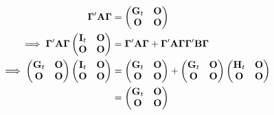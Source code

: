 \begin{Lemma}{}{}
\begin{align*}
        \Matrix{\Gamma}'\Matrix{A\Gamma}
         & =
        \begin{pmatrix}
            \Matrix{G}_t & \Matrix{O} \\
            \Matrix{O}   & \Matrix{O}
        \end{pmatrix}                                                                             \\
        \implies\Matrix{\Gamma}'\Matrix{A\Gamma}\begin{pmatrix}
                                                    \Matrix{I}_t & \Matrix{O} \\
                                                    \Matrix{O}   & \Matrix{O}
                                                \end{pmatrix}
         & =\Matrix{\Gamma}'\Matrix{A\Gamma}+\Matrix{\Gamma}'\Matrix{A\Gamma}\Matrix{\Gamma}'\Matrix{B\Gamma} \\
        \implies
        \begin{pmatrix}
            \Matrix{G}_t & \Matrix{O} \\
            \Matrix{O}   & \Matrix{O}
        \end{pmatrix}\begin{pmatrix}
                         \Matrix{I}_t & \Matrix{O} \\
                         \Matrix{O}   & \Matrix{O}
                     \end{pmatrix}
         & =\begin{pmatrix}
                \Matrix{G}_t & \Matrix{O} \\
                \Matrix{O}   & \Matrix{O}
            \end{pmatrix}+
        \begin{pmatrix}
            \Matrix{G}_t & \Matrix{O} \\
            \Matrix{O}   & \Matrix{O}
        \end{pmatrix}
        \begin{pmatrix}
            \Matrix{H}_t & \Matrix{O} \\
            \Matrix{O}   & \Matrix{O}
        \end{pmatrix}                                                                             \\
         & =\begin{pmatrix}
                \Matrix{G}_t & \Matrix{O} \\
                \Matrix{O}   & \Matrix{O}
            \end{pmatrix}

\end{align*}
\end{Lemma}
